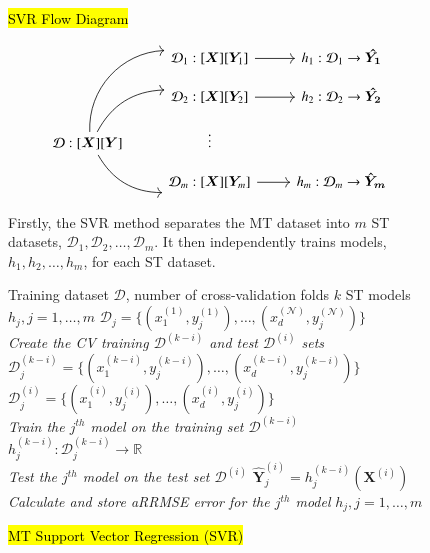 \documentclass[preprint,12pt]{elsarticle}
\begin{document}
\begin{figure}
\caption{\hl{SVR Flow Diagram}}
\small
\label{diag:SVR}
\centering
\begin{minipage}{0.9\textwidth}
\[\begin{tikzcd}[column sep = small, row sep = small]
& & \mathcal{D}_1 :  [\bm X][\bm Y_1]  \arrow[rr]  & & h_1 :  \mathcal{D}_1 \rightarrow \bm{\hat{Y_1}}\\
& & \mathcal{D}_2 :  [\bm X][\bm Y_2]  \arrow[rr] & & h_2 :  \mathcal{D}_2 \rightarrow \bm{\hat{Y_2}} \\        
\mathcal{D} :  [\bm X][\bm Y]  \arrow[uurr, bend left=45] \arrow[urr, bend left] \arrow[drr, bend right]  		& & \vdots \\
& & \mathcal{D}_m :  [\bm X][\bm Y_m] \arrow[rr] & & h_m :  \mathcal{D}_m \rightarrow \bm{\hat{Y}_m}
\end{tikzcd}\]
{\footnotesize Firstly, the SVR method separates the MT dataset into $m$ ST datasets, $\mathcal{D}_1, \mathcal{D}_2, \ldots, \mathcal{D}_m$. It then independently trains models, $h_1, h_2, \ldots, h_m$, for each ST dataset.\par}
\end{minipage}
\begin{algorithm}[H]
\caption{\hl{MT Support Vector Regression (SVR)}}
\small
\centering
\label{alg:SVR} 
\begin{algorithmic}[1]
\renewcommand{\algorithmicrequire}{\textbf{Input:}}
\renewcommand{\algorithmicensure}{\textbf{Output:}}
\REQUIRE Training dataset $\mathcal{D}$, number of cross-validation folds $k$
\ENSURE  ST models $h_j, j = 1,\ldots,m$
\STATE $\mathcal{D}_j = \{(x_1^{(1)},y_j^{(1)}), \ldots, (x_d^{(\mathcal N)},y_j^{(\mathcal N)})\}$
\\ \textit{Create the CV training $\mathcal{D}^{(k-i)}$ and test $\mathcal{D}^{(i)}$ sets}
\STATE $\mathcal{D}_j^{(k-i)} = \{(x_1^{(k-i)},y_j^{(k-i)}), \ldots, (x_d^{(k-i)},y_j^{(k-i)})\}$ 
\STATE $\mathcal{D}_j^{(i)} = \{(x_1^{(i)},y_j^{(i)}), \ldots, (x_d^{(i)},y_j^{(i)})\}$ 
\\ \textit{Train the $j^{th}$ model on the training set $\mathcal{D}^{(k-i)}$}
\STATE $h_j^{(k-i)} : \mathcal{D}_j^{(k-i)} \rightarrow \mathbb{R}$
\\ \textit{Test the $j^{th}$ model on the test set $\mathcal{D}^{(i)}$}
\STATE $\hat{\bm Y}_j^{(i)} = h_j^{(k-i)}(\bm X^{(i)})$
\ENDFOR
\\ \textit{Calculate and store aRRMSE error for the $j^{th}$ model}
\ENDFOR
\RETURN $h_j, j=1,\ldots,m$ 
\end{algorithmic} 
\end{algorithm}
\end{figure}
\end{document}
